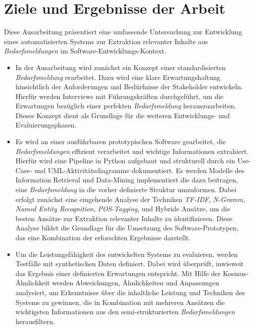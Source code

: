 \section{Ziele und Ergebnisse der Arbeit}
\label{sec:zieleundergebnis}
Diese Ausarbeitung präsentiert eine umfassende Untersuchung zur Entwicklung eines automatisierten Systems zur Extraktion relevanter Inhalte aus \emph{Bedarfsmeldungen} im Software-Entwicklungs-Kontext.
\begin{itemize}
	\item In der Ausarbeitung wird zunächst ein Konzept einer standardisierten \emph{Bedarfsmeldung} erarbeitet. Dazu wird eine klare Erwartungshaltung hinsichtlich der Anforderungen und Bedürfnisse der Stakeholder entwickeln. Hierfür werden Interviews mit Führungskräften durchgeführt, um die Erwartungen bezüglich einer \glqq{}perfekten\grqq{} \emph{Bedarfsmeldung} herauszuarbeiten. Dieses Konzept dient als Grundlage für die weiteren Entwicklungs- und Evaluierungsphasen.
	\item Es wird an einer ausführbaren prototypischen Software gearbeitet, die \emph{Bedarfsmeldungen} effizient verarbeitet und wichtige Informationen extrahiert. Hierfür wird eine Pipeline in Python aufgebaut und strukturell durch ein Use-Case- und UML-Aktivitätsdiagramme dokumentiert. Es werden Modelle des Information Retrieval und Data-Mining implementiert die dazu beitragen, eine \emph{Bedarfsmeldung} in die vorher definierte Struktur umzuformen. Dabei erfolgt zunächst eine eingehende Analyse der Techniken \emph{TF-IDF}, \emph{N-Gramm}, \emph{Named Entity Recognition}, \emph{POS-Tagging}, und Hybride Ansätze, um die besten Ansätze zur Extraktion relevanter Inhalte zu identifizieren. Diese Analyse bildet die Grundlage für die Umsetzung des Software-Prototypen, das eine Kombination der erforschten Ergebnisse darstellt.
	\item Um die Leistungsfähigkeit des entwickelten Systems zu evaluieren, werden Testfälle mit synthetischen Daten definiert. Dabei wird überprüft, inwieweit das Ergebnis einer definierten Erwartungen entspricht. Mit Hilfe der Kosinus-Ähnlichkeit werden Abweichungen, Ähnlichkeiten und Anpassungen analysiert, um Erkenntnisse über die inhaltliche Leistung und Techniken des Systems zu gewinnen, die in Kombination mit mehreren Ansätzen die wichtigsten Informationen aus den semi-strukturierten \emph{Bedarfsmeldungen} herausfiltern. %
\end{itemize}
